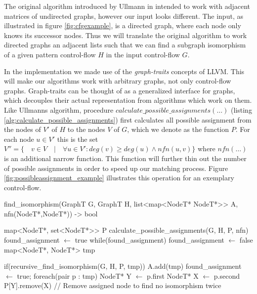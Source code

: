 The original algorithm introduced by Ullmann in intended to work with adjacent matrices of undirected graphs, however our input looks different. The input, as illustrated in figure \ref{fig:cfgexample}, is a directed graph, where each node only knows its successor nodes. Thus we will translate the original algorithm to work directed graphs an adjacent lists such that we can find a subgraph isomorphism of a given pattern control-flow $H$ in the input control-flow $G$.

In the implementation we made use of the \textit{graph-traits} concepts of LLVM. This will make our algorithms work with arbitrary graphs, not only control-flow graphs. Graph-traits can be thought of as a generalized interface for graphs, which decouples their actual representation from algorithms which work on them. %
\\

Like Ullmanns algorithm, procedure $calculate\_possible\_assignments(\dots)$ (listing \ref{alg:calculate_possible_assignments}) first calculates all possible assignment from the nodes of $V'$ of $H$ to the nodes $V$ of $G$, which we denote as the function $P$. For each node $u \in V'$ this is the set $V'' = \{\quad v \in V\quad |\quad\forall u \in V': deg(v) \geq deg(u) \land nfn(u, v)\}$ where $nfn(\dots)$ is an additional narrow function. This function will further thin out the number of possible assignments in order to speed up our matching process. Figure \ref{fig:possibleassignment_example} illustrates this operation for an exemplary control-flow.
\begin{algorithm}[mathescape, caption={Find isomorphism}, label={alg:find_isomorphism}]
find_isomorphism(GraphT G, GraphT H, list<map<NodeT* NodeT*>> A, nfn(NodeT*,NodeT*)) -> bool

    map<NodeT*, set<NodeT*>> P
    calculate_possible_assignments(G, H, P, nfn)
    found_assignment $\gets$ true
    while(found_assignment)    
        found_assignment $\gets$ false
        map<NodeT*, NodeT*> tmp
            
        if(recursive_find_isomorphism(G, H, P, tmp))
   	        A.add(tmp)
            found_assignment $\gets$ true;
            foreach(pair p : tmp)
                NodeT* Y $\gets$ p.first
                NodeT* X $\gets$ p.second
                P[Y].remove(X)	// Remove assigned node to find no isomorphism twice
                
\end{algorithm}


